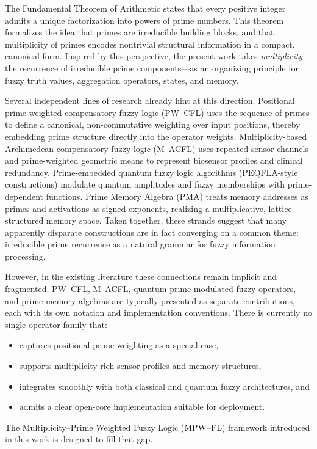 \documentclass[11pt]{article}
\begin{document}
The Fundamental Theorem of Arithmetic states that every positive integer admits a unique factorization into powers of prime numbers. This theorem formalizes the idea that primes are irreducible building blocks, and that multiplicity of primes encodes nontrivial structural information in a compact, canonical form. Inspired by this perspective, the present work takes \emph{multiplicity}---the recurrence of irreducible prime components---as an organizing principle for fuzzy truth values, aggregation operators, states, and memory.

Several independent lines of research already hint at this direction. Positional prime-weighted compensatory fuzzy logic (PW--CFL) uses the sequence of primes to define a canonical, non-commutative weighting over input positions, thereby embedding prime structure directly into the operator weights. Multiplicity-based Archimedean compensatory fuzzy logic (M--ACFL) uses repeated sensor channels and prime-weighted geometric means to represent biosensor profiles and clinical redundancy. Prime-embedded quantum fuzzy logic algorithms (PEQFLA-style constructions) modulate quantum amplitudes and fuzzy memberships with prime-dependent functions. Prime Memory Algebra (PMA) treats memory addresses as primes and activations as signed exponents, realizing a multiplicative, lattice-structured memory space. Taken together, these strands suggest that many apparently disparate constructions are in fact converging on a common theme: irreducible prime recurrence as a natural grammar for fuzzy information processing.

However, in the existing literature these connections remain implicit and fragmented. PW--CFL, M--ACFL, quantum prime-modulated fuzzy operators, and prime memory algebras are typically presented as separate contributions, each with its own notation and implementation conventions. There is currently no single operator family that:
\begin{itemize}
  \item captures positional prime weighting as a special case,
  \item supports multiplicity-rich sensor profiles and memory structures,
  \item integrates smoothly with both classical and quantum fuzzy architectures, and
  \item admits a clear open-core implementation suitable for deployment.
\end{itemize}
The Multiplicity--Prime Weighted Fuzzy Logic (MPW--FL) framework introduced in this work is designed to fill that gap.
\end{document}
